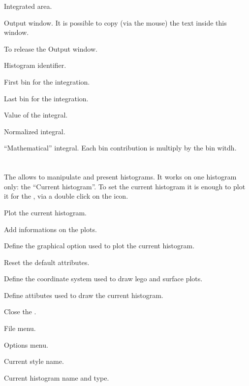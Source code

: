 \begin{EnumZB}
\item Integrated area.
\item Output window. It is possible to copy (via the mouse) the
      text inside this window.
\item To release the Output window.
\end{EnumZB}
\begin{EnumZW}
\item Histogram identifier.
\item First bin for the integration.
\item Last bin for the integration.
\item Value of the integral.
\item Normalized integral.
\item ``Mathematical'' integral. Each bin contribution is
      multiply by the bin witdh.
\end{EnumZW}

\clearpage

\section{\HSP}
The \HSP{} allows to manipulate and present histograms. It works on 
one histogram only: the ``Current histogram''. To set the current histogram
it is enough to plot it for the \MB, via a double click on the icon.
\begin{EnumZB}
\item Plot the current histogram.
\item Add informations on the plots.
\item Define the graphical option used to plot the current histogram.
\item Reset the default attributes.
\item Define the coordinate system used to draw lego and surface plots.
\item Define attibutes used to draw the current histogram.
\item Close the \HSP.
\end{EnumZB}
\begin{EnumZW}
\item File menu.
\item Options menu.
\item Current style name.
\item Current histogram name and type.
\end{EnumZW}

